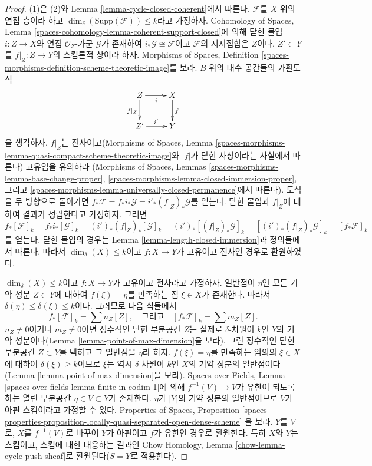 \begin{proof}
(1)은 (2)와 Lemma \ref{lemma-cycle-closed-coherent}에서 따른다.
$\mathcal{F}$를 $X$ 위의 연접 층이라 하고
$\dim_\delta(\text{Supp}(\mathcal{F})) \leq k$라고 가정하자.
Cohomology of Spaces, Lemma
\ref{spaces-cohomology-lemma-coherent-support-closed}에 의해 닫힌 몰입
$i : Z \to X$와 연접 $\mathcal{O}_Z$-가군 $\mathcal{G}$가 존재하여
$i_*\mathcal{G} \cong \mathcal{F}$이고 $\mathcal{F}$의 지지집합은
$Z$이다. $Z' \subset Y$를 $f|_Z : Z \to Y$의 스킴론적 상이라 하자.
Morphisms of Spaces, Definition
\ref{spaces-morphisms-definition-scheme-theoretic-image}를 보라.
$B$ 위의 대수 공간들의 가환도식
$$
\xymatrix{
Z \ar[r]_i \ar[d]_{f|_Z} &
X \ar[d]^f \\
Z' \ar[r]^{i'} & Y
}
$$
을 생각하자. $f|_Z$는 전사이고(Morphisms of Spaces, Lemma
\ref{spaces-morphisms-lemma-quasi-compact-scheme-theoretic-image}와
$|f|$가 닫힌 사상이라는 사실에서 따른다) 고유임을 유의하라
(Morphisms of Spaces, Lemmas
\ref{spaces-morphisms-lemma-base-change-proper},
\ref{spaces-morphisms-lemma-closed-immersion-proper}, 그리고
\ref{spaces-morphisms-lemma-universally-closed-permanence}에서 따른다).
도식을 두 방향으로 돌아가면
$f_*\mathcal{F} = f_*i_*\mathcal{G} = i'_*(f|_Z)_*\mathcal{G}$를 얻는다.
닫힌 몰입과 $f|_Z$에 대하여 결과가 성립한다고 가정하자. 그러면
$$
f_*[\mathcal{F}]_k = f_*i_*[\mathcal{G}]_k
= (i')_*(f|_Z)_*[\mathcal{G}]_k =
(i')_*[(f|_Z)_*\mathcal{G}]_k =
[(i')_*(f|_Z)_*\mathcal{G}]_k = [f_*\mathcal{F}]_k
$$
를 얻는다. 닫힌 몰입의 경우는 Lemma
\ref{lemma-length-closed-immersion}과 정의들에서 따른다. 따라서
$\dim_\delta(X) \leq k$이고 $f : X \to Y$가 고유이고 전사인 경우로
환원하였다.

\medskip\noindent
$\dim_\delta(X) \leq k$이고 $f : X \to Y$가 고유이고 전사라고 가정하자.
일반점이 $\eta$인 모든 기약 성분 $Z \subset Y$에 대하여
$f(\xi) = \eta$를 만족하는 점 $\xi \in X$가 존재한다. 따라서
$\delta(\eta) \leq \delta(\xi) \leq k$이다. 그러므로 다음 식들에서
$$
f_*[\mathcal{F}]_k = \sum n_Z[Z],
\quad
\text{그리고}
\quad
[f_*\mathcal{F}]_k = \sum m_Z[Z].
$$
$n_Z \not = 0$이거나 $m_Z \not = 0$이면 정수적인 닫힌 부분공간
$Z$는 실제로 $\delta$-차원이 $k$인 $Y$의 기약 성분이다(Lemma
\ref{lemma-point-of-max-dimension}을 보라). 그런 정수적인 닫힌 부분공간
$Z \subset Y$를 택하고 그 일반점을 $\eta$라 하자.
$f(\xi) = \eta$를 만족하는 임의의 $\xi \in X$에 대하여
$\delta(\xi) \geq k$이므로 $\xi$는 역시 $\delta$-차원이 $k$인
$X$의 기약 성분의 일반점이다(Lemma
\ref{lemma-point-of-max-dimension}을 보라). Spaces over Fields, Lemma
\ref{spaces-over-fields-lemma-finite-in-codim-1}에 의해
$f^{-1}(V) \to V$가 유한이 되도록 하는 열린 부분공간
$\eta \in V \subset Y$가 존재한다. $\eta$가 $|Y|$의 기약 성분의
일반점이므로 $V$가 아핀 스킴이라고 가정할 수 있다. Properties of Spaces,
Proposition
\ref{spaces-properties-proposition-locally-quasi-separated-open-dense-scheme}
을 보라. $Y$를 $V$로, $X$를 $f^{-1}(V)$로 바꾸어 $Y$가 아핀이고
$f$가 유한인 경우로 환원한다. 특히 $X$와 $Y$는 스킴이고, 스킴에 대한
대응하는 결과인 Chow Homology, Lemma
\ref{chow-lemma-cycle-push-sheaf}로 환원된다($S = Y$로 적용한다).
\end{proof}

